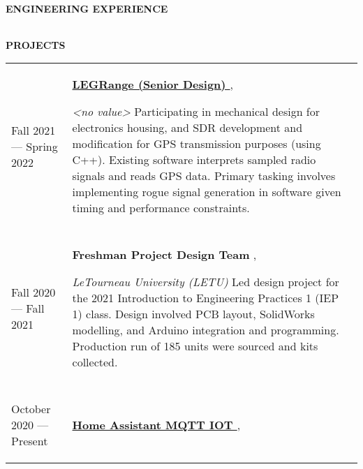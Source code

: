 \documentclass{article}
\begin{document}
 

  
\textbf{\textcolor{title}{\uppercase{ Engineering Experience }}}  \medskip \\ \hfill
\begin{tabularx}{\textwidth}{R{3.5cm} L}
	  
\end{tabularx}
  

  
\textbf{\textcolor{title}{\uppercase{ Projects }}}  \medskip \\ \hfill
\begin{tabularx}{\textwidth}{R{3.5cm} L}
	  
	\textcolor{accent}{
		  
		 Fall 2021  ---  Spring 2022 
		  
	} &
	  
	\textbf{\href{ https://letu.edu/academics/engineering/nathan_green_senior_design_team.html }{ LEGRange (Senior Design) }},
	  
	\textit{ <no value> } \linebreak
	 Participating in mechanical design for electronics housing, and SDR development and modification for GPS transmission purposes (using C++). Existing software interprets sampled radio signals and reads GPS data. Primary tasking involves implementing rogue signal generation in software given timing and performance constraints.
                 \\\\ \hfill
	  
	\textcolor{accent}{
		  
		 Fall 2020  ---  Fall 2021 
		  
	} &
	  
	\textbf{ Freshman Project Design Team },
	  
	\textit{ LeTourneau University (LETU) } \linebreak
	 Led design project for the 2021 Introduction to Engineering Practices 1 (IEP 1) class. Design involved PCB layout, SolidWorks modelling, and Arduino integration and programming. Production run of 185 units were sourced and kits collected.
                 \\\\ \hfill
	  
	\textcolor{accent}{
		  
		 October 2020  ---  Present 
		  
	} &
	  
	\textbf{\href{ https://github.com/W-Floyd/ha-mqtt-iot }{ Home Assistant MQTT IOT }},
	  

\end{tabularx}
\end{document}
